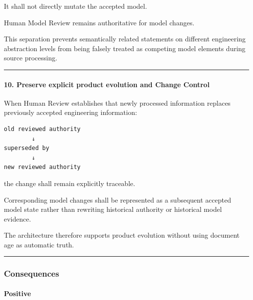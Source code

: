 It shall not directly mutate the accepted model.

Human Model Review remains authoritative for model changes.

This separation prevents semantically related statements on different engineering abstraction levels from being falsely treated as competing model elements during source processing.

\begin{center}\rule{0.5\linewidth}{0.5pt}\end{center}

\hypertarget{10-preserve-explicit-product-evolution-and-change-control}{%
\paragraph{10. Preserve explicit product evolution and Change Control}\label{10-preserve-explicit-product-evolution-and-change-control}}

When Human Review establishes that newly processed information replaces previously accepted engineering information:

\begin{verbatim}
old reviewed authority
        ↓
superseded by
        ↓
new reviewed authority
\end{verbatim}

the change shall remain explicitly traceable.

Corresponding model changes shall be represented as a subsequent accepted model state rather than rewriting historical authority or historical model evidence.

The architecture therefore supports product evolution without using document age as automatic truth.

\begin{center}\rule{0.5\linewidth}{0.5pt}\end{center}

\hypertarget{consequences-15}{%
\subsubsection{Consequences}\label{consequences-15}}

\hypertarget{positive-6}{%
\paragraph{Positive}\label{positive-6}}

